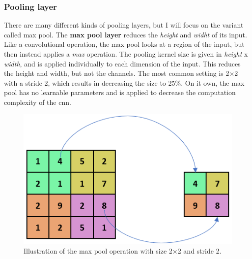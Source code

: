     
    
\subsubsection{Pooling layer}
    There are many different kinds of pooling layers, but I will focus on the variant called max pool. The \textbf{max pool layer} reduces the \textit{height} and \textit{widht} of its input\cite{o2015introduction_convolutions}. Like a convolutional operation, the max pool looks at a region of the input, but then instead applies a \textit{max} operation. The pooling kernel size is given in \textit{height} x \textit{width}, and is applied individually to each dimension of the input. This reduces the height and width, but not the channels. The most common setting is 2×2 with a stride 2, which results in decreasing the size to 25\%. On it own, the max pool has no learnable parameters and is applied to decrease the computation complexity of the \gls{cnn}.

    \begin{figure}[H]
        \centering
        \includegraphics[scale=0.5]{figures/max_pool.png}
        \caption[The max pool operation]{Illustration of the max pool operation with size 2×2 and stride 2.}
      	\medskip 
        \label{maxpool_fig}
    \end{figure}

